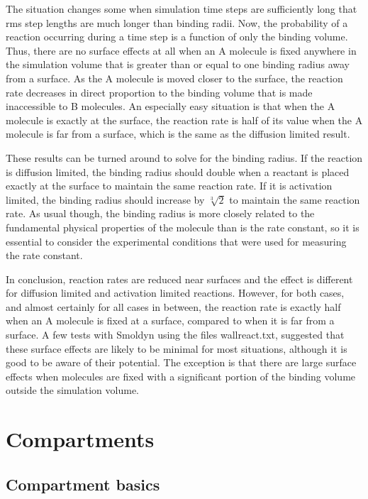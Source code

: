 \documentclass {scrbook}
\begin{document}
The situation changes some when simulation time steps are sufficiently long that rms step lengths are much longer than binding radii. Now, the probability of a reaction occurring during a time step is a function of only the binding volume. Thus, there are no surface effects at all when an A molecule is fixed anywhere in the simulation volume that is greater than or equal to one binding radius away from a surface. As the A molecule is moved closer to the surface, the reaction rate decreases in direct proportion to the binding volume that is made inaccessible to B molecules. An especially easy situation is that when the A molecule is exactly at the surface, the reaction rate is half of its value when the A molecule is far from a surface, which is the same as the diffusion limited result.

These results can be turned around to solve for the binding radius. If the reaction is diffusion limited, the binding radius should double when a reactant is placed exactly at the surface to maintain the same reaction rate. If it is activation limited, the binding radius should increase by $\sqrt[3]{2}$ to maintain the same reaction rate. As usual though, the binding radius is more closely related to the fundamental physical properties of the molecule than is the rate constant, so it is essential to consider the experimental conditions that were used for measuring the rate constant.

In conclusion, reaction rates are reduced near surfaces and the effect is different for diffusion limited and activation limited reactions. However, for both cases, and almost certainly for all cases in between, the reaction rate is exactly half when an A molecule is fixed at a surface, compared to when it is far from a surface. A few tests with Smoldyn using the files wallreact.txt, suggested that these surface effects are likely to be minimal for most situations, although it is good to be aware of their potential. The exception is that there are large surface effects when molecules are fixed with a significant portion of the binding volume outside the simulation volume.


\chapter{Compartments}

\section{Compartment basics}
\end{document}
